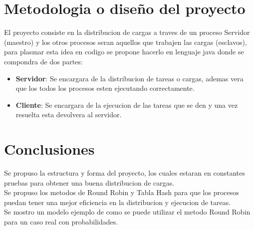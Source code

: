 \documentclass[conference,letterpaper]{IEEEtran}
\begin{document}
\section{Metodologia o diseño del proyecto}
El proyecto consiste en la distribucion de cargas a traves de un proceso Servidor (maestro) y los otros procesos seran aquellos que  trabajen las cargas (esclavos), para plasmar esta idea en codigo se propone hacerlo en lenguaje java donde se compondra de dos partes:

\begin{itemize}
    \item \textbf{Servidor}: Se encargara de la distribucion de tareas o cargas, ademas vera que los todos los procesos esten ejecutando correctamente.
    \item \textbf{Cliente}: Se encargara de la ejecucion de las tareas que se den y una vez resuelta esta devolvera al servidor.
\end{itemize}


\section{Conclusiones}
Se propuso la estructura y forma del proyecto, los cuales estaran en constantes pruebas para obtener una buena distribucion de cargas.\\

Se propuso los metodos de Round Robin y Tabla Hash para que los procesos puedan tener una mejor eficiencia en la distribucion y ejecucion de tareas.\\

Se mostro un modelo ejemplo de como se puede utilizar el metodo Round Robin para un caso real con probabilidades.
\end{document}
